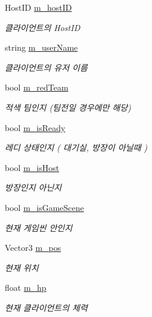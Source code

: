 \begin{DoxyCompactItemize}
\item 
Host\+ID \hyperlink{class_room_client_a44db06515969e9ef7d4fad346bc01a7c}{m\+\_\+host\+ID}
\begin{DoxyCompactList}\small\item\em 클라이언트의 Host\+ID \end{DoxyCompactList}\item 
string \hyperlink{class_room_client_ae501fdc166c6ae17dc2286ecd382ae71}{m\+\_\+user\+Name}
\begin{DoxyCompactList}\small\item\em 클라이언트의 유저 이름 \end{DoxyCompactList}\item 
bool \hyperlink{class_room_client_a4552bc59af3cf8137a506cdfbe7540cb}{m\+\_\+red\+Team}
\begin{DoxyCompactList}\small\item\em 적색 팀인지 (팀전일 경우에만 해당) \end{DoxyCompactList}\item 
bool \hyperlink{class_room_client_a09fb4ef6ca643e53d68ad771761e8289}{m\+\_\+is\+Ready}
\begin{DoxyCompactList}\small\item\em 레디 상태인지 ( 대기실, 방장이 아닐때 ) \end{DoxyCompactList}\item 
bool \hyperlink{class_room_client_a09df06af0caa37c9ee7d3b91fe80b317}{m\+\_\+is\+Host}
\begin{DoxyCompactList}\small\item\em 방장인지 아닌지 \end{DoxyCompactList}\item 
bool \hyperlink{class_room_client_a491106d1b6fbf97fd76a7d1449bf5de9}{m\+\_\+is\+Game\+Scene}
\begin{DoxyCompactList}\small\item\em 현재 게임씬 안인지 \end{DoxyCompactList}\item 
Vector3 \hyperlink{class_room_client_a7000a6db44ab9d2f646d625d33c8d8b7}{m\+\_\+pos}
\begin{DoxyCompactList}\small\item\em 현재 위치 \end{DoxyCompactList}\item 
float \hyperlink{class_room_client_a2b4f07062f9927aa30772306a1b9d18a}{m\+\_\+hp}
\begin{DoxyCompactList}\small\item\em 현재 클라이언트의 체력 \end{DoxyCompactList}\item 

\end{DoxyCompactItemize}
